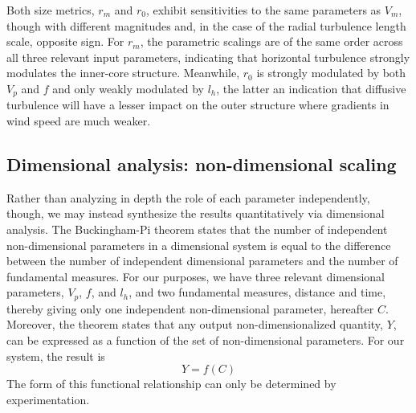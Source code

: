 \documentclass[12pt]{article}
\begin{document}
Both size metrics, $r_m$ and $r_0$, exhibit sensitivities to the same parameters as $V_m$, though with different magnitudes and, in the case of the radial turbulence length scale, opposite sign. For $r_m$, the parametric scalings are of the same order across all three relevant input parameters, indicating that horizontal turbulence strongly modulates the inner-core structure. Meanwhile, $r_0$ is strongly modulated by both $V_p$ and $f$ and only weakly modulated by $l_h$, the latter an indication that diffusive turbulence will have a lesser impact on the outer structure where gradients in wind speed are much weaker.


\subsection{Dimensional analysis: non-dimensional scaling}
Rather than analyzing in depth the role of each parameter independently, though, we may instead synthesize the results quantitatively via dimensional analysis. The Buckingham-Pi theorem states that the number of independent non-dimensional parameters in a dimensional system is equal to the difference between the number of independent dimensional parameters and the number of fundamental measures. For our purposes, we have three relevant dimensional parameters, $V_p$, $f$, and $l_h$, and two fundamental measures, distance and time, thereby giving only one independent non-dimensional parameter, hereafter $C$. Moreover, the theorem states that any output non-dimensionalized quantity, $Y$, can be expressed as a function of the set of non-dimensional parameters.  For our system, the result is
\begin{equation}
	\label{eq:buckpi}
	Y = f(C)
\end{equation}
The form of this functional relationship can only be determined by experimentation.
\end{document}
